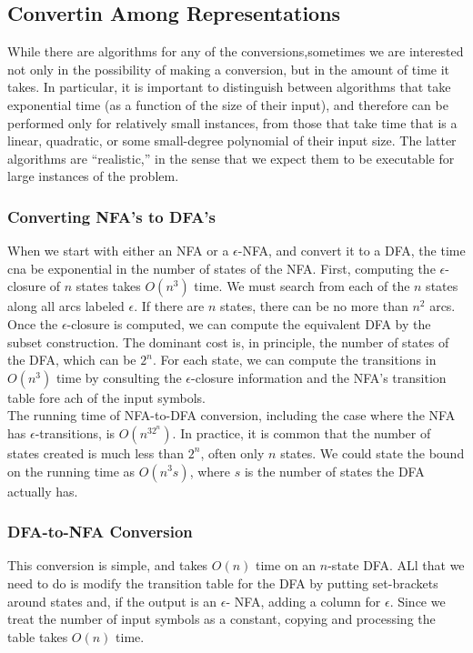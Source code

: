 \documentclass[]{article}
\begin{document}
    \subsection*{Convertin Among Representations}
      While there are algorithms for any of the conversions,sometimes we are
      interested not only in the possibility of making a conversion, but in the
      amount of time it takes. In particular, it is important to distinguish
      between algorithms that take exponential time (as a function of the size
      of their input), and therefore can be performed only for relatively small
      instances, from those that take time that is a linear, quadratic, or some
      small-degree polynomial of their input size. The latter algorithms are
      ``realistic,'' in the sense that we expect them to be executable for large
      instances of the problem.

      \subsubsection*{Converting NFA's to DFA's}
        When we start with either an NFA or a $\epsilon$-NFA, and convert it to
        a DFA, the time cna be exponential in the number of states of the NFA.
        First, computing the $\epsilon$-closure of $n$ states takes $O(n^3)$
        time. We must search from each of the $n$ states along all arcs labeled
        $\epsilon$. If there are $n$ states, there can be no more than $n^2$
        arcs. \\
        \indent Once the $\epsilon$-closure is computed, we can compute the
        equivalent DFA by the subset construction. The dominant cost is, in
        principle, the number of states of the DFA, which can be $2^n$. For each
        state, we can compute the transitions in $O(n^3)$ time by consulting the
        $\epsilon$-closure information and the NFA's transition table fore ach
        of the input symbols. \\
        \indent The running time of NFA-to-DFA conversion, including the case
        where the NFA has $\epsilon$-transitions, is $O(n^32^n)$. In practice,
        it is common that the number of states created is much less than $2^n$,
        often only $n$ states. We could state the bound on the running time as
        $O(n^3s)$, where $s$ is the number of states the DFA actually has.

      \subsubsection*{DFA-to-NFA Conversion}
        This conversion is simple, and takes $O(n)$ time on an $n$-state DFA.
        ALl that we need to do is modify the transition table for the DFA by
        putting set-brackets around states and, if the output is an $\epsilon$-
        NFA, adding a column for $\epsilon$. Since we treat the number of input
        symbols as a constant, copying and processing the table takes $O(n)$
        time.
\end{document}
